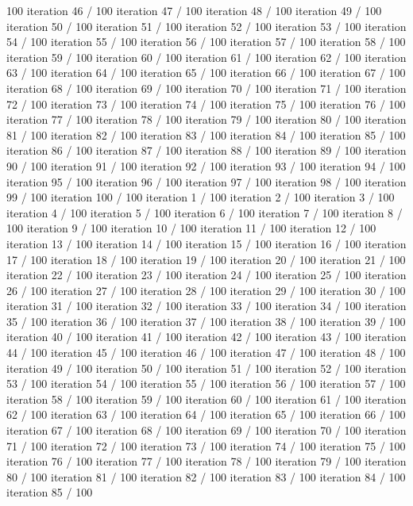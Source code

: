 100 iteration 46 / 100 iteration 47 / 100 iteration 48 / 100 iteration
49 / 100 iteration 50 / 100 iteration 51 / 100 iteration 52 / 100
iteration 53 / 100 iteration 54 / 100 iteration 55 / 100 iteration 56 /
100 iteration 57 / 100 iteration 58 / 100 iteration 59 / 100 iteration
60 / 100 iteration 61 / 100 iteration 62 / 100 iteration 63 / 100
iteration 64 / 100 iteration 65 / 100 iteration 66 / 100 iteration 67 /
100 iteration 68 / 100 iteration 69 / 100 iteration 70 / 100 iteration
71 / 100 iteration 72 / 100 iteration 73 / 100 iteration 74 / 100
iteration 75 / 100 iteration 76 / 100 iteration 77 / 100 iteration 78 /
100 iteration 79 / 100 iteration 80 / 100 iteration 81 / 100 iteration
82 / 100 iteration 83 / 100 iteration 84 / 100 iteration 85 / 100
iteration 86 / 100 iteration 87 / 100 iteration 88 / 100 iteration 89 /
100 iteration 90 / 100 iteration 91 / 100 iteration 92 / 100 iteration
93 / 100 iteration 94 / 100 iteration 95 / 100 iteration 96 / 100
iteration 97 / 100 iteration 98 / 100 iteration 99 / 100 iteration 100 /
100 iteration 1 / 100 iteration 2 / 100 iteration 3 / 100 iteration 4 /
100 iteration 5 / 100 iteration 6 / 100 iteration 7 / 100 iteration 8 /
100 iteration 9 / 100 iteration 10 / 100 iteration 11 / 100 iteration 12
/ 100 iteration 13 / 100 iteration 14 / 100 iteration 15 / 100 iteration
16 / 100 iteration 17 / 100 iteration 18 / 100 iteration 19 / 100
iteration 20 / 100 iteration 21 / 100 iteration 22 / 100 iteration 23 /
100 iteration 24 / 100 iteration 25 / 100 iteration 26 / 100 iteration
27 / 100 iteration 28 / 100 iteration 29 / 100 iteration 30 / 100
iteration 31 / 100 iteration 32 / 100 iteration 33 / 100 iteration 34 /
100 iteration 35 / 100 iteration 36 / 100 iteration 37 / 100 iteration
38 / 100 iteration 39 / 100 iteration 40 / 100 iteration 41 / 100
iteration 42 / 100 iteration 43 / 100 iteration 44 / 100 iteration 45 /
100 iteration 46 / 100 iteration 47 / 100 iteration 48 / 100 iteration
49 / 100 iteration 50 / 100 iteration 51 / 100 iteration 52 / 100
iteration 53 / 100 iteration 54 / 100 iteration 55 / 100 iteration 56 /
100 iteration 57 / 100 iteration 58 / 100 iteration 59 / 100 iteration
60 / 100 iteration 61 / 100 iteration 62 / 100 iteration 63 / 100
iteration 64 / 100 iteration 65 / 100 iteration 66 / 100 iteration 67 /
100 iteration 68 / 100 iteration 69 / 100 iteration 70 / 100 iteration
71 / 100 iteration 72 / 100 iteration 73 / 100 iteration 74 / 100
iteration 75 / 100 iteration 76 / 100 iteration 77 / 100 iteration 78 /
100 iteration 79 / 100 iteration 80 / 100 iteration 81 / 100 iteration
82 / 100 iteration 83 / 100 iteration 84 / 100 iteration 85 / 100
